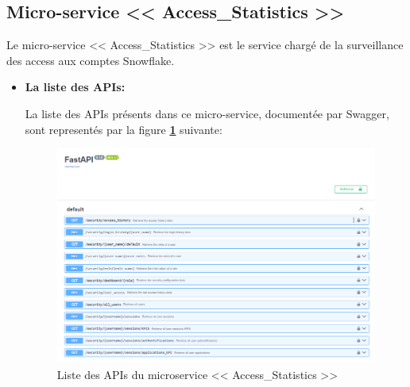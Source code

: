 \subsection{Micro-service << Access\_Statistics >>}
\par Le micro-service << Access\_Statistics >>  est le service chargé de la surveillance des access aux comptes Snowflake.
\begin{itemize}
    \item \textbf{La liste des APIs:}
        \par La liste des APIs présents dans ce micro-service, documentée par Swagger, sont representés par la figure \textbf{\ref{fig:apiAccess}} suivante:
        \begin{figure}[H]
            \centering
            \includegraphics[width =1\linewidth]{img/captures/access_apis.PNG}
            \caption{Liste des APIs du microservice << Access\_Statistics >> }
                \label{fig:apiAccess}
        \end{figure}


\end{itemize}
